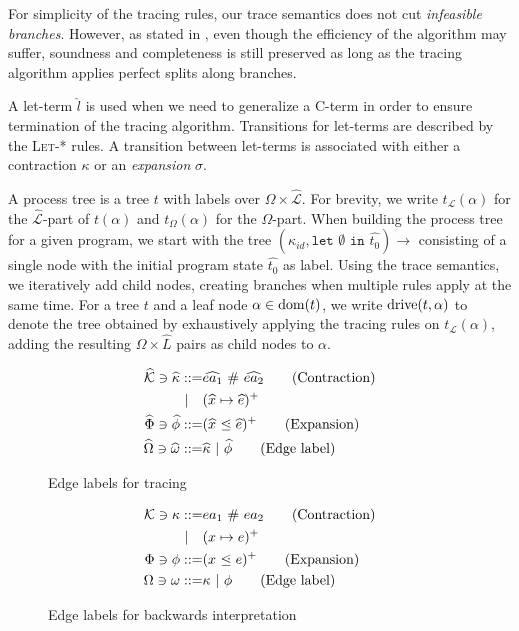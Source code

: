 \documentclass[10pt]{../sigplanconf}
\newcommand{\dom}{\ensuremath{{\rm dom}}}
\newcommand{\gen}{\ensuremath{~{\leq\kern-6pt \raisebox{1pt}{$\cdot$}}~}}
\newcommand{\w}[1]{\ensuremath{\widehat{#1}}}
\begin{document}
For simplicity of the tracing rules, our trace semantics does not cut
\emph{infeasible branches}. However, as stated in
\cite{abramov2000universal}, even though the efficiency of the
algorithm may suffer, soundness and completeness is still preserved as
long as the tracing algorithm applies perfect splits along branches.

A let-term $\widehat{l}$ is used when we need to generalize a C-term
in order to ensure termination of the tracing algorithm. Transitions
for let-terms are described by the \textsc{Let-*} rules. A transition
between let-terms is associated with either a contraction $\kappa$ or
an \emph{expansion} $\sigma$.

A process tree is a tree $t$ with labels over $\Omega \times
\widehat{\mathcal{L}}$. For brevity, we write $t_\mathcal{L}(\alpha)$
for the $\widehat{\mathcal{L}}$-part of $t(\alpha)$ and
$t_\Omega(\alpha)$ for the $\Omega$-part. When building the process
tree for a given program, we start with the tree $(\kappa_{id},
\texttt{let $\emptyset$ in $\widehat{t_0}$}) \rightarrow$ consisting
of a single node with the initial program state $\widehat{t_0}$ as
label. Using the trace semantics, we iteratively add child nodes,
creating branches when multiple rules apply at the same time. For a
tree $t$ and a leaf node $\alpha \in \dom(t)$, we write ${\rm
  drive}(t, \alpha)$ to denote the tree obtained by exhaustively
applying the tracing rules on $t_\mathcal{L}(\alpha)$, adding the
resulting $\Omega \times \widehat{L}$ pairs as child nodes to
$\alpha$.

\begin{figure}
  \begin{align*}
    \w{\mathcal{K}} \ni \widehat{\kappa} ::= & \widehat{ea_1}~\#~\widehat{ea_2} \tag{Contraction} \\
                       | \quad & (\widehat{x} \mapsto \widehat{e})^{+} \\
    \w{\Phi} \ni \w{\phi} ::= & (\widehat{x} \gen \widehat{e})^{+} \tag{Expansion} \\
    \w{\Omega} \ni \w{\omega} ::= & \w{\kappa} ~|~ \w{\phi} \tag{Edge label}
  \end{align*}
  \caption{Edge labels for tracing}
  \label{fig:edge}
\end{figure}

\begin{figure}
  \begin{align*}
    \mathcal{K} \ni \kappa ::= & ea_1~\#~ea_2 \tag{Contraction} \\
                       | \quad & (x \mapsto e)^{+} \\
    \Phi \ni \phi ::= & (x \gen e)^{+} \tag{Expansion} \\
    \Omega \ni \omega ::= & \kappa ~|~ \phi \tag{Edge label}
  \end{align*}
  \caption{Edge labels for backwards interpretation}
  \label{fig:edge_back}
\end{figure}
\end{document}
